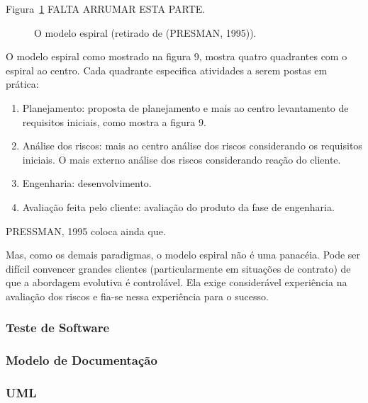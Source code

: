 Figura~\ref{f1.9} FALTA ARRUMAR ESTA PARTE.
\begin{figure}[!hbp]
\makebox[\textwidth]{\framebox[5cm]{\rule{0pt}{5cm}}}
\caption{O modelo espiral (retirado de (PRESMAN, 1995)).} \label{f1.9}
\end{figure}

O modelo espiral como mostrado na figura 9, mostra quatro quadrantes com o espiral ao centro. Cada quadrante especifica atividades a serem postas em prática:

\begin{enumerate}
	\item Planejamento: proposta de planejamento e mais ao centro levantamento de requisitos iniciais, como mostra a figura 9.
	\item Análise dos riscos: mais ao centro análise dos riscos considerando os requisitos iniciais. O mais externo análise dos riscos considerando reação do cliente.
	\item Engenharia: desenvolvimento.
	\item Avaliação feita pelo cliente: avaliação do produto da fase de engenharia.
\end{enumerate}

PRESSMAN, 1995 coloca ainda que.

\begin{citacao}
Mas, como os demais paradigmas, o modelo espiral não é uma 	 panacéia. Pode ser difícil convencer grandes clientes (particularmente em situações de contrato) de que a abordagem evolutiva é controlável. Ela exige considerável experiência na avaliação dos riscos e fia-se nessa experiência para o sucesso. 
\end{citacao}


\subsubsection{Teste de Software}
\subsubsection{Modelo de Documentação}
\subsubsection{UML}